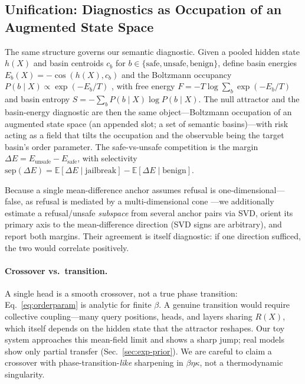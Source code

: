 \documentclass[letterpaper]{article} %
\begin{document}
\subsection{Unification: Diagnostics as Occupation of an Augmented State Space}
\label{sec:theory-unify}
The same structure governs our semantic diagnostic. Given a pooled hidden state $h(X)$ and basin
centroids $c_b$ for $b\in\{\text{safe},\text{unsafe},\text{benign}\}$, define basin energies
$E_b(X)=-\cos(h(X),c_b)$ and the Boltzmann occupancy $P(b\mid X)\propto\exp(-E_b/T)$
\citep{ctm2023cosine}, with free energy $F=-T\log\sum_b\exp(-E_b/T)$ and basin entropy
$S=-\sum_b P(b\mid X)\log P(b\mid X)$. The null attractor and the basin-energy diagnostic are then
the same object---Boltzmann occupation of an augmented state space (an appended slot; a set of
semantic basins)---with risk acting as a field that tilts the occupation and the observable being
the target basin's order parameter. The safe-vs-unsafe competition is the margin $\Delta
E=E_{\text{unsafe}}-E_{\text{safe}}$, with selectivity $\mathrm{sep}(\Delta E)=
\mathbb{E}[\Delta E\mid\text{jailbreak}]-\mathbb{E}[\Delta E\mid\text{benign}]$.

Because a single mean-difference anchor assumes refusal is one-dimensional---false, as refusal is
mediated by a multi-dimensional cone \citep{wollschlager2025geometry,moreThanSingleDirection2026}---we
additionally estimate a refusal/unsafe \emph{subspace} from several anchor pairs via SVD, orient its
primary axis to the mean-difference direction (SVD signs are arbitrary), and report both margins.
Their agreement is itself diagnostic: if one direction sufficed, the two would correlate positively.

\paragraph{Crossover vs.\ transition.} A single head is a smooth crossover, not a true phase
transition: Eq.~\eqref{eq:orderparam} is analytic for finite $\beta$. A genuine transition would
require collective coupling---many query positions, heads, and layers sharing $R(X)$, which itself
depends on the hidden state that the attractor reshapes. Our toy system approaches this mean-field
limit and shows a sharp jump; real models show only partial transfer
(Sec.~\ref{sec:exp-prior}). We are careful to claim a crossover with phase-transition-\emph{like}
sharpening in $\beta\eta\kappa$, not a thermodynamic singularity.
\end{document}
